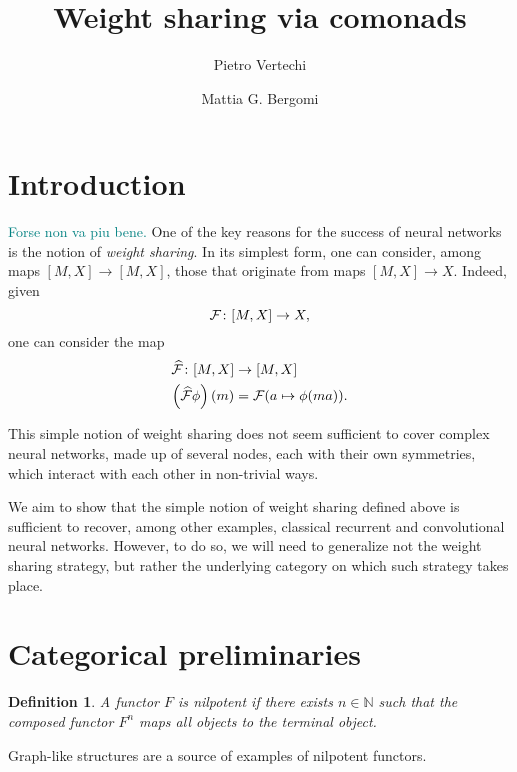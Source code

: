 \documentclass[12pt]{article}
\title{Weight sharing via comonads}
\author{
    Pietro Vertechi \and Mattia G. Bergomi
}
\date{}
\newtheorem{definition}{Definition}
\newcommand{\pietro}[1]{\textcolor{teal}{#1}}
\newcommand{\N}{{\mathbb{N}}}
\begin{document}
\maketitle
\begin{abstract}
\end{abstract}

\section{Introduction}

\pietro{Forse non va piu bene.}
One of the key reasons for the success of neural networks is the notion of {\em weight sharing}. In its simplest form, one can consider, among maps $[M, X] \rightarrow [M, X]$, those that originate from maps $[M, X] \rightarrow X$. Indeed, given
\begin{equation*}
    {\cal F} \colon [M, X] \rightarrow X,
\end{equation*}
one can consider the map
\begin{align*}
    \widehat{\cal F} \colon [M, X]       & \rightarrow [M, X]              \\
    \left(\widehat{\cal F}\phi\right)(m) & = {\cal F}(a \mapsto \phi(ma)).
\end{align*}

This simple notion of weight sharing does not seem sufficient to cover complex neural networks, made up of several nodes, each with their own symmetries, which interact with each other in non-trivial ways.

We aim to show that the simple notion of weight sharing defined above is sufficient to recover, among other examples, classical recurrent and convolutional neural networks. However, to do so, we will need to generalize not the weight sharing strategy, but rather the underlying category on which such strategy takes place.

\section{Categorical preliminaries}

\begin{definition}\label{def:nilpotent_functor}
    A functor $F$ is {\em nilpotent} if there exists $n \in \N$ such that the composed functor $F^n$ maps all objects to the terminal object.
\end{definition}

Graph-like structures are a source of examples of nilpotent functors.
\end{document}
